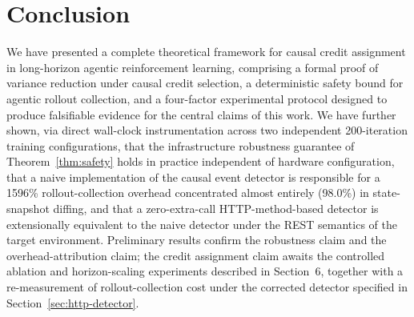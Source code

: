 \documentclass[11pt]{article}
\begin{document}
\section{Conclusion}

We have presented a complete theoretical framework for causal credit
assignment in long-horizon agentic reinforcement learning, comprising a formal
proof of variance reduction under causal credit selection, a deterministic
safety bound for agentic rollout collection, and a four-factor experimental
protocol designed to produce falsifiable evidence for the central claims of
this work. We have further shown, via direct wall-clock instrumentation
across two independent 200-iteration training configurations, that the
infrastructure robustness guarantee of Theorem~\ref{thm:safety} holds in
practice independent of hardware configuration, that a naive implementation
of the causal event detector is responsible for a 1596\% rollout-collection
overhead concentrated almost entirely (98.0\%) in state-snapshot diffing, and
that a zero-extra-call HTTP-method-based detector is extensionally equivalent
to the naive detector under the REST semantics of the target environment.
Preliminary results confirm the robustness claim and the overhead-attribution
claim; the credit assignment claim awaits the controlled ablation and
horizon-scaling experiments described in Section~6, together with a
re-measurement of rollout-collection cost under the corrected detector
specified in Section~\ref{sec:http-detector}.
\end{document}
